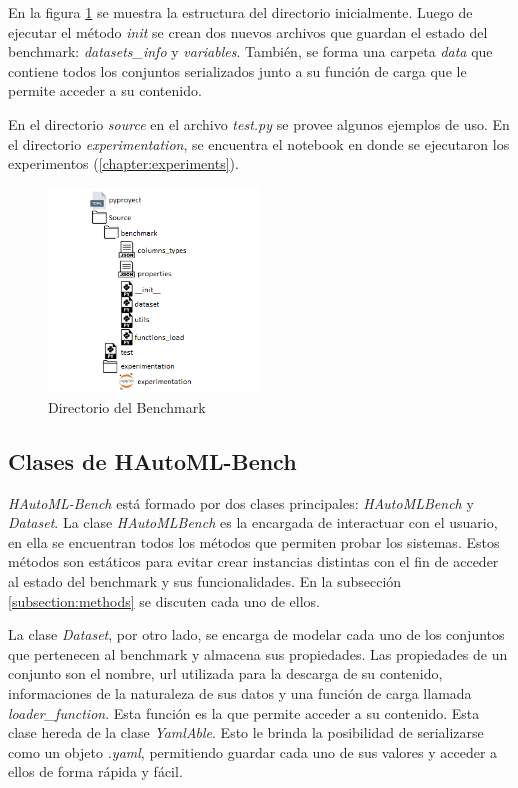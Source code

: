 En la figura \ref{fig:image1} se muestra la estructura del directorio inicialmente. Luego de ejecutar el método \textit{init} se crean dos nuevos archivos que 
guardan el estado del benchmark: \textit{datasets\_info} y \textit{variables}. También, se forma una carpeta \textit{data} que contiene todos los conjuntos 
serializados junto a su función de carga que le permite acceder a su contenido.

En el directorio \textit{source} en el archivo \textit{test.py} se provee algunos ejemplos de uso. En el directorio \textit{experimentation}, se encuentra el notebook 
en donde se ejecutaron los experimentos (\ref{chapter:experiments}).

\begin{figure}
    \centering
    \includegraphics[width=0.5\textwidth]{Graphics/directory.png}
    \caption{Directorio del Benchmark}
    \label{fig:image1}
 \end{figure}

\subsection{Clases de HAutoML-Bench}\label{subsection:class}

\textit{HAutoML-Bench} está formado por dos clases principales: \textit{HAutoMLBench} y \textit{Dataset}.
La clase \textit{HAutoMLBench} es la encargada de interactuar con el usuario, en ella se encuentran todos los 
métodos que permiten probar los sistemas. Estos métodos son estáticos para evitar crear instancias distintas con el fin de acceder
al estado del benchmark y sus funcionalidades. En la subsección \ref{subsection:methods} se discuten cada uno de ellos. 

La clase \textit{Dataset}, por otro lado, se encarga de modelar cada uno de los conjuntos que pertenecen al benchmark y 
almacena sus propiedades. Las propiedades de un conjunto son el nombre, url utilizada para la descarga de su 
contenido, informaciones de la naturaleza de sus datos y una función de carga llamada 
\textit{loader\_function}. Esta función es la que permite acceder a su contenido. 
Esta clase hereda de la clase \textit{YamlAble}. Esto le brinda la posibilidad  de serializarse como un objeto \textit{.yaml}, 
permitiendo guardar cada uno de sus valores y acceder a ellos de forma rápida y fácil. 

